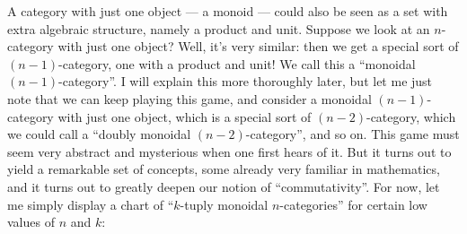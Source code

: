 \documentclass{article}
\begin{document}
A category with just one object --- a monoid --- could also be seen as a
set with extra algebraic structure, namely a product and unit. Suppose
we look at an \(n\)-category with just one object? Well, it's very
similar: then we get a special sort of \((n-1)\)-category, one with a
product and unit! We call this a ``monoidal \((n-1)\)-category''. I will
explain this more thoroughly later, but let me just note that we can
keep playing this game, and consider a monoidal \((n-1)\)-category with
just one object, which is a special sort of \((n-2)\)-category, which we
could call a ``doubly monoidal \((n-2)\)-category'', and so on. This
game must seem very abstract and mysterious when one first hears of it.
But it turns out to yield a remarkable set of concepts, some already
very familiar in mathematics, and it turns out to greatly deepen our
notion of ``commutativity''. For now, let me simply display a chart of
``\(k\)-tuply monoidal \(n\)-categories'' for certain low values of
\(n\) and \(k\):
\end{document}
